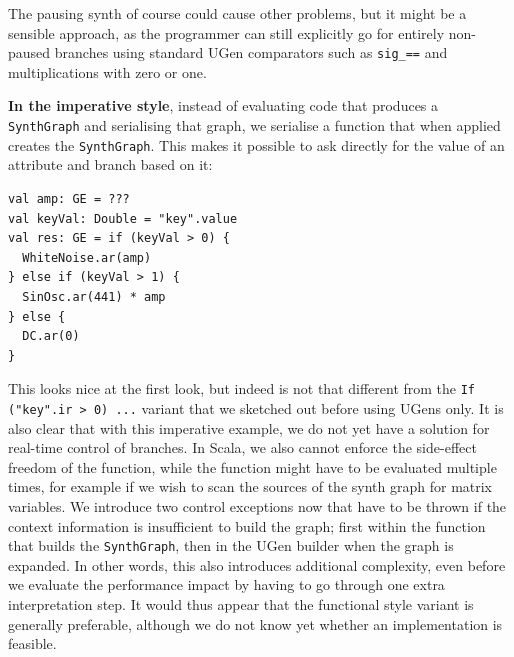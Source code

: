 \documentclass[11pt,a4paper]{article}
\begin{document}
The pausing synth of course could cause other problems, but it might be a sensible approach, as the programmer can still explicitly go for entirely non-paused branches using standard UGen comparators such as \verb!sig_==! and multiplications with zero or one.

\textbf{In the imperative style}, instead of evaluating code that produces a \verb!SynthGraph! and serialising that graph, we serialise a function that when applied creates the \verb!SynthGraph!. This makes it possible to ask directly for the value of an attribute and branch based on it:
%
\begin{verbatim}
val amp: GE = ???
val keyVal: Double = "key".value
val res: GE = if (keyVal > 0) {
  WhiteNoise.ar(amp)
} else if (keyVal > 1) {
  SinOsc.ar(441) * amp
} else {
  DC.ar(0)
}
\end{verbatim}
%
This looks nice at the first look, but indeed is not that different from the \verb!If ("key".ir > 0) ...! variant that we sketched out before using UGens only. It is also clear that with this imperative example, we do not yet have a solution for real-time control of branches. In Scala, we also cannot enforce the side-effect freedom of the function, while the function might have to be evaluated multiple times, for example if we wish to scan the sources of the synth graph for matrix variables. We introduce two control exceptions now that have to be thrown if the context information is insufficient to build the graph; first within the function that builds the \verb!SynthGraph!, then in the UGen builder when the graph is expanded. In other words, this also introduces additional complexity, even before we evaluate the performance impact by having to go through one extra interpretation step. It would thus appear that the functional style variant is generally preferable, although we do not know yet whether an implementation is feasible.
\end{document}
